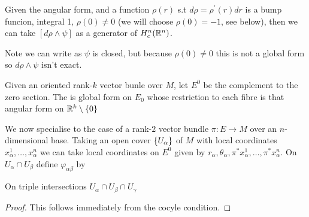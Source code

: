 \documentclass{article}
\begin{document}
Given the angular form, and a function $\rho(r)$ s.t $d\rho = \rho^\prime(r) dr$ is a bump funcion, integral 1, $\rho(0)\neq0$ (we will choose $\rho(0)=-1$, see below), then we can take $[d\rho \wedge \psi]$ as a generator of $H_c^n(\mathbb{R}^n)$. 

\begin{center}
\end{center}

\begin{remark}
	Note we can write 
	as $\psi$ is closed, but because $\rho(0)\neq 0$ this is not a global form so $d\rho \wedge \psi$ isn't exact. 
\end{remark}

\begin{definition}
	Given an oriented rank-$k$ vector bunle over $M$, let $E^0$ be the complement to the zero section. The  is global form on $E_0$ whose restriction to each fibre is that angular form on $\mathbb{R}^k \setminus \left\{ 0 \right\}$
\end{definition}

We now specialise to the case of a rank-$2$ vector bundle $\pi : E \to M$ over an $n$-dimensional base. Taking an open cover $\left\{ U_\alpha \right\}$ of $M$ with local coordinates $x_\alpha^1, \dots, x_\alpha^n$ we can take local coordinates on $E^0$ given by $r_\alpha,\theta_\alpha,\pi^\ast x_\alpha^1, \dots, \pi^\ast x^n_\alpha$. On $U_\alpha \cap U_\beta$ define $\varphi_{\alpha\beta}$ by 
\eq{
	\theta_\beta = \theta_\alpha + \pi^\ast \varphi_{\alpha\beta}
}
\begin{lemma}
	On triple intersections $U_\alpha \cap U_\beta \cap U_\gamma$ 
\end{lemma}
\begin{proof}
	This follows immediately from the cocyle condition. 
\end{proof}
\end{document}
